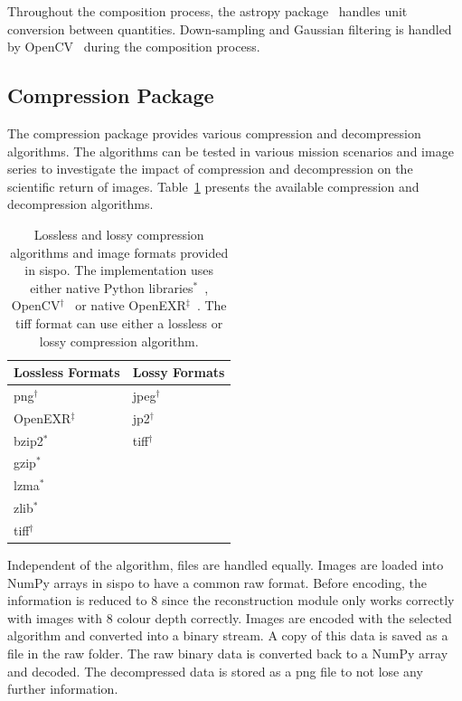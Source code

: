 Throughout the composition process, the astropy package~\cite{robitaille2013astropy, price2018astropy} handles unit conversion between quantities. Down-sampling and Gaussian filtering is handled by OpenCV~\cite{opencv_library} during the composition process.

\subsection{Compression Package}
The compression package provides various compression and decompression algorithms. The algorithms can be tested in various mission scenarios and image series to investigate the impact of compression and decompression on the scientific return of images. Table~\ref{tab:compression_format} presents the available compression and decompression algorithms.

\begin{table}[htb]
    \centering
    \caption{Lossless and lossy compression algorithms and image formats provided in \gls{sispo}. The implementation uses either native Python libraries$^{\ast}$~\cite{FoundationDataArchiving}, OpenCV$^{\dagger}$~\cite{opencv_library} or native OpenEXR$^{\ddagger}$~\cite{openexr}. The \gls{tiff} format can use either a lossless or lossy compression algorithm.}
    \label{tab:compression_format}
    \begin{tabular}{l|l}
        \textbf{Lossless Formats}  & \textbf{Lossy Formats} \\ \hline
        \gls{png}$^{\dagger}$      & \gls{jpeg}$^{\dagger}$  \\
        OpenEXR$^{\ddagger}$       & \gls{jp2}$^{\dagger}$   \\
        bzip2$^{\ast}$             & \gls{tiff}$^{\dagger}$  \\
        gzip$^{\ast}$              &                \\
        \gls{lzma}$^{\ast}$        &                \\
        zlib$^{\ast}$              &     \\
        \gls{tiff}$^{\dagger}$     &  
    \end{tabular}
\end{table}

Independent of the algorithm, files are handled equally. Images are loaded into NumPy arrays in \gls{sispo} to have a common raw format. Before encoding, the information is reduced to \SI{8}{\bit} since the reconstruction module only works correctly with images with \SI{8}{\bit} colour depth correctly. Images are encoded with the selected algorithm and converted into a binary stream. A copy of this data is saved as a file in the raw folder. The raw binary data is converted back to a NumPy array and decoded. The decompressed data is stored as a \gls{png} file to not lose any further information.

